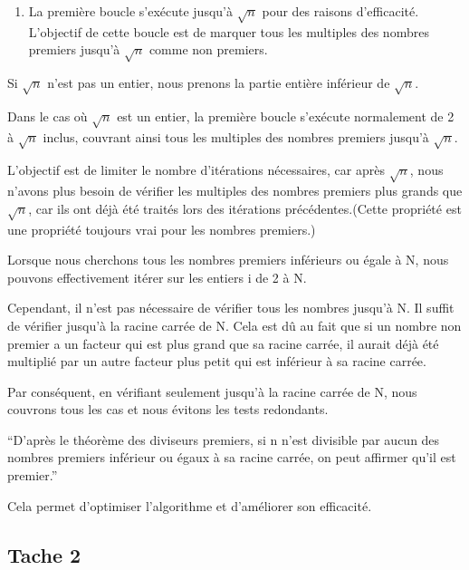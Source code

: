 \documentclass[
]{article}
\providecommand{\tightlist}{%
  \setlength{\itemsep}{0pt}\setlength{\parskip}{0pt}}
\begin{document}
\begin{enumerate}
\def\labelenumi{\arabic{enumi}.}
\setcounter{enumi}{2}
\tightlist
\item
  La première boucle s'exécute jusqu'à \(\sqrt{n}\) pour des raisons
  d'efficacité. L'objectif de cette boucle est de marquer tous les
  multiples des nombres premiers jusqu'à \(\sqrt{n}\) comme non
  premiers.
\end{enumerate}

Si \(\sqrt{n}\) n'est pas un entier, nous prenons la partie entière
inférieur de \(\sqrt{n}\).

Dans le cas où \(\sqrt{n}\) est un entier, la première boucle s'exécute
normalement de 2 à \(\sqrt{n}\) inclus, couvrant ainsi tous les
multiples des nombres premiers jusqu'à \(\sqrt{n}\).

L'objectif est de limiter le nombre d'itérations nécessaires, car après
\(\sqrt{n}\), nous n'avons plus besoin de vérifier les multiples des
nombres premiers plus grands que \(\sqrt{n}\), car ils ont déjà été
traités lors des itérations précédentes.(Cette propriété est une
propriété toujours vrai pour les nombres premiers.)

Lorsque nous cherchons tous les nombres premiers inférieurs ou égale à
N, nous pouvons effectivement itérer sur les entiers i de 2 à N.

Cependant, il n'est pas nécessaire de vérifier tous les nombres jusqu'à
N. Il suffit de vérifier jusqu'à la racine carrée de N. Cela est dû au
fait que si un nombre non premier a un facteur qui est plus grand que sa
racine carrée, il aurait déjà été multiplié par un autre facteur plus
petit qui est inférieur à sa racine carrée.

Par conséquent, en vérifiant seulement jusqu'à la racine carrée de N,
nous couvrons tous les cas et nous évitons les tests redondants.

``D'après le théorème des diviseurs premiers, si n n'est divisible par
aucun des nombres premiers inférieur ou égaux à sa racine carrée, on
peut affirmer qu'il est premier.''

Cela permet d'optimiser l'algorithme et d'améliorer son efficacité.

\hypertarget{tache-2}{%
\subsection{Tache 2}\label{tache-2}}
\end{document}
